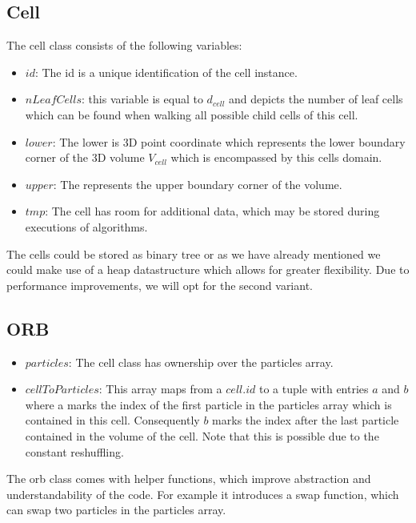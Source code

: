 \documentclass[]{article}
\begin{document}
\subsection{Cell}

The cell class consists of the following variables:

\begin{itemize}
	\item $id$: The id is a unique identification of the cell instance.
	\item $nLeafCells$: this variable is equal to $d_{cell}$ and depicts the number of leaf cells which can be found when walking all possible child cells of this cell. 
	\item $lower$: The lower is 3D point coordinate which represents the lower boundary corner of the 3D volume $V_{cell}$ which is encompassed by this cells domain.
	\item $upper$: The represents the upper boundary corner of the volume.	
	\item $tmp$: The cell has room for additional data, which may be stored during executions of algorithms. 
\end{itemize}


The cells could be stored as binary tree or as we have already mentioned we could make use of a heap datastructure which allows for greater flexibility. Due to performance improvements, we will opt for the second variant.


\subsection{ORB}

\begin{itemize}
	\item $particles$: The cell class has ownership over the particles array.
	\item $cellToParticles$: This array maps from a $cell.id$ to a tuple with entries $a$ and $b$ where a marks the index of the first particle in the particles array which is contained in this cell. Consequently $b$ marks the index after the last particle contained in the volume of the cell. Note that this is possible due to the constant reshuffling.
\end{itemize}

The orb class comes with helper functions, which improve abstraction and understandability of the code. For example it introduces a swap function, which can swap two particles in the particles array.
\end{document}
